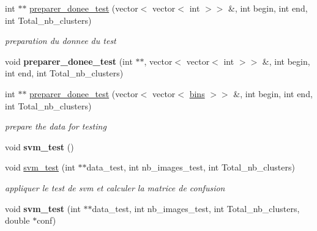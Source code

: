 \begin{DoxyCompactItemize}
\item 
\hypertarget{classmysvm_ae7edf7ed3b6e8d71ddc0d97acdb593e9}{
int $\ast$$\ast$ \hyperlink{classmysvm_ae7edf7ed3b6e8d71ddc0d97acdb593e9}{preparer\_\-donee\_\-test} (vector$<$ vector$<$ int $>$$>$ \&, int begin, int end, int Total\_\-nb\_\-clusters)}
\label{classmysvm_ae7edf7ed3b6e8d71ddc0d97acdb593e9}

\begin{DoxyCompactList}\small\item\em preparation du donnee du test \end{DoxyCompactList}\item 
\hypertarget{classmysvm_a10c0bdb7ca4ea6c64b7864ad44315dae}{
void {\bfseries preparer\_\-donee\_\-test} (int $\ast$$\ast$, vector$<$ vector$<$ int $>$$>$ \&, int begin, int end, int Total\_\-nb\_\-clusters)}
\label{classmysvm_a10c0bdb7ca4ea6c64b7864ad44315dae}

\item 
\hypertarget{classmysvm_a2afa430096385ec61419d15dcdaea54f}{
int $\ast$$\ast$ \hyperlink{classmysvm_a2afa430096385ec61419d15dcdaea54f}{preparer\_\-donee\_\-test} (vector$<$ vector$<$ \hyperlink{classbins}{bins} $>$$>$ \&, int begin, int end, int Total\_\-nb\_\-clusters)}
\label{classmysvm_a2afa430096385ec61419d15dcdaea54f}

\begin{DoxyCompactList}\small\item\em prepare the data for testing \end{DoxyCompactList}\item 
\hypertarget{classmysvm_a5893e27cdfb64485945ed708d7883296}{
void {\bfseries svm\_\-test} ()}
\label{classmysvm_a5893e27cdfb64485945ed708d7883296}

\item 
\hypertarget{classmysvm_ad53bbabda658b08b8acd8712b0af474b}{
void \hyperlink{classmysvm_ad53bbabda658b08b8acd8712b0af474b}{svm\_\-test} (int $\ast$$\ast$data\_\-test, int nb\_\-images\_\-test, int Total\_\-nb\_\-clusters)}
\label{classmysvm_ad53bbabda658b08b8acd8712b0af474b}

\begin{DoxyCompactList}\small\item\em appliquer le test de svm et calculer la matrice de confusion \end{DoxyCompactList}\item 
\hypertarget{classmysvm_a4065c2ceb87256f5a14d346fa094e42c}{
void {\bfseries svm\_\-test} (int $\ast$$\ast$data\_\-test, int nb\_\-images\_\-test, int Total\_\-nb\_\-clusters, double $\ast$conf)}
\label{classmysvm_a4065c2ceb87256f5a14d346fa094e42c}


\end{DoxyCompactItemize}
